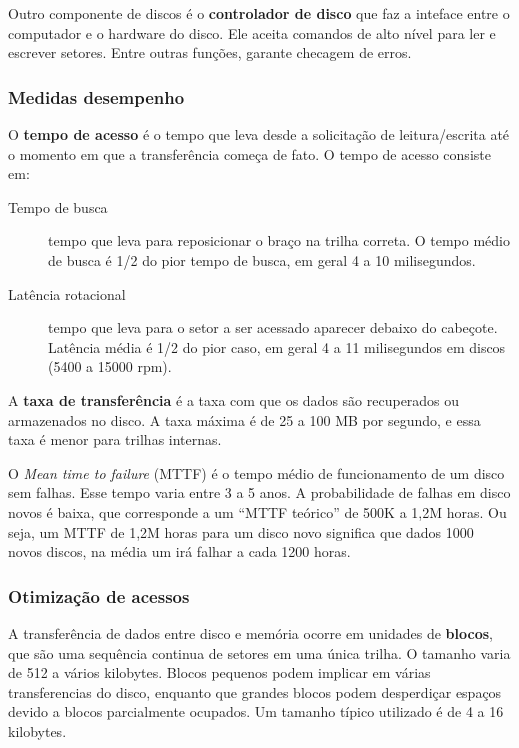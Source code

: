 Outro componente de discos é o {\bf controlador de disco} que faz a inteface 
entre o computador e o hardware do disco.
Ele aceita comandos de alto nível para ler e escrever setores.
Entre outras funções, garante checagem de erros.

\subsubsection{Medidas desempenho}

O \textbf{tempo de acesso} é o tempo que leva desde a solicitação de leitura/escrita
até o momento em que a transferência começa de fato. 
O tempo de acesso consiste em:
\begin{description}
\item[Tempo de busca] tempo que leva para reposicionar o braço na trilha correta.
O tempo médio de busca é 1/2 do pior tempo de busca, em geral 4 a 10 milisegundos.

\item[Latência rotacional] tempo que leva para o setor a ser acessado
aparecer debaixo do cabeçote. Latência média é 1/2 do pior caso, em geral
4 a 11 milisegundos em discos (5400 a 15000 rpm). 
\end{description}

A \textbf{taxa de transferência} é a taxa com que os dados são recuperados ou 
armazenados no disco. A taxa máxima é de 25 a 100 MB por segundo, e essa
taxa é menor para trilhas internas.

O \emph{Mean time to failure} (MTTF) é o tempo médio de funcionamento de um disco
sem falhas. 
Esse tempo varia entre 3 a 5 anos. 
A probabilidade de falhas em disco novos é baixa, que corresponde a um
``MTTF teórico'' de 500K a 1,2M horas.
Ou seja, um MTTF de 1,2M horas para um disco novo significa que dados 1000 novos discos,
na média um irá falhar a cada 1200 horas.

\subsubsection{Otimização de acessos}

A transferência de dados entre disco e memória ocorre em unidades de \textbf{blocos},
que são uma sequência continua de setores em uma única trilha.
O tamanho varia de 512 a vários kilobytes. Blocos pequenos podem implicar 
em várias transferencias do disco, enquanto que grandes blocos podem 
desperdiçar espaços devido a blocos parcialmente ocupados.
Um tamanho típico utilizado é de 4 a 16 kilobytes.

